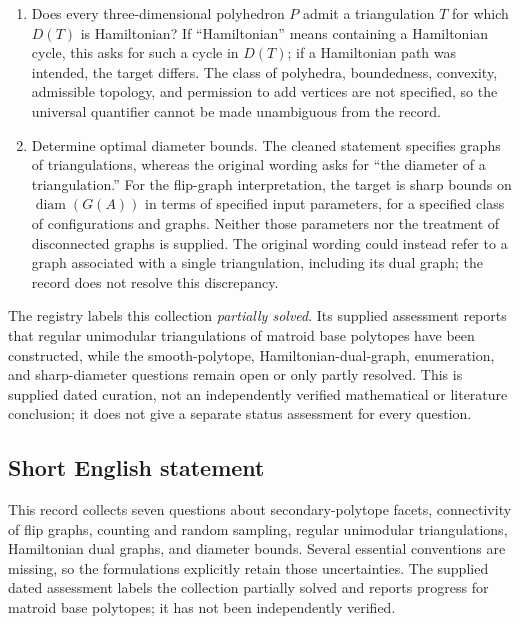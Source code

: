 \documentclass[11pt]{article}
\begin{document}
\begin{enumerate}
\item Does every three-dimensional polyhedron \(P\) admit a triangulation \(T\) for which \(D(T)\) is Hamiltonian? If ``Hamiltonian'' means containing a Hamiltonian cycle, this asks for such a cycle in \(D(T)\); if a Hamiltonian path was intended, the target differs. The class of polyhedra, boundedness, convexity, admissible topology, and permission to add vertices are not specified, so the universal quantifier cannot be made unambiguous from the record.
\item Determine optimal diameter bounds. The cleaned statement specifies graphs of triangulations, whereas the original wording asks for ``the diameter of a triangulation.'' For the flip-graph interpretation, the target is sharp bounds on \(\operatorname{diam}(G(A))\) in terms of specified input parameters, for a specified class of configurations and graphs. Neither those parameters nor the treatment of disconnected graphs is supplied. The original wording could instead refer to a graph associated with a single triangulation, including its dual graph; the record does not resolve this discrepancy.
\end{enumerate}

The registry labels this collection \emph{partially solved}. Its supplied assessment reports that regular unimodular triangulations of matroid base polytopes have been constructed, while the smooth-polytope, Hamiltonian-dual-graph, enumeration, and sharp-diameter questions remain open or only partly resolved. This is supplied dated curation, not an independently verified mathematical or literature conclusion; it does not give a separate status assessment for every question.
\subsection{Short English statement}
This record collects seven questions about secondary-polytope facets, connectivity of flip graphs, counting and random sampling, regular unimodular triangulations, Hamiltonian dual graphs, and diameter bounds. Several essential conventions are missing, so the formulations explicitly retain those uncertainties. The supplied dated assessment labels the collection partially solved and reports progress for matroid base polytopes; it has not been independently verified.
\end{document}
